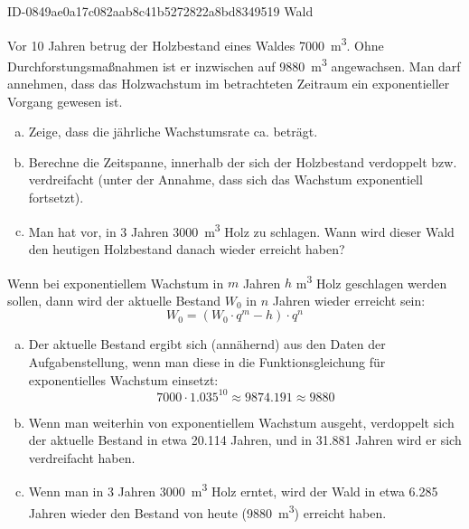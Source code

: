 \begin{exercise}
      {ID-0849ae0a17c082aab8c41b5272822a8bd8349519}
      {Wald}
  \ifproblem\problem\par
    Vor 10 Jahren betrug der Holzbestand eines Waldes \SI{7000}{\cubic\metre}.
    Ohne Durchforstungsmaßnahmen ist er inzwischen auf \SI{9880}{\cubic\metre}
    angewachsen. Man darf annehmen, dass das Holzwachstum im
    betrachteten Zeitraum ein exponentieller Vorgang gewesen ist.
    \begin{enumerate}[a)]
      \item Zeige, dass die jährliche Wachstumsrate ca.  beträgt.
      \item Berechne die Zeitspanne, innerhalb der sich der Holzbestand
            verdoppelt bzw. verdreifacht (unter der Annahme, dass sich
            das Wachstum exponentiell fortsetzt).
      \item Man hat vor, in 3 Jahren \SI{3000}{\cubic\metre} Holz zu schlagen.
            Wann wird dieser Wald den heutigen Holzbestand danach
            wieder erreicht haben?
    \end{enumerate}
  \fi
  \ifoutline\outline\par
    Wenn bei exponentiellem Wachstum in $m$ Jahren $h$
    \si{\cubic\metre} Holz geschlagen werden sollen, dann
    wird der aktuelle Bestand $W_{0}$ in $n$ Jahren wieder
    erreicht sein:
    \begin{equation*}
      W_{0}=\left(W_{0}\cdot q^{m}-h\right)\cdot q^{n}
    \end{equation*}
  \fi
  \ifoutcome\outcome\par
    \begin{enumerate}[a)]
      \item Der aktuelle Bestand ergibt sich (annähernd) aus
            den Daten der Aufgabenstellung, wenn man diese in
            die Funktionsgleichung für exponentielles Wachstum
            einsetzt:
            \begin{equation*}
              \num{7000}\cdot\num{1.035}^{10}\approx\num{9874.191}\approx\num{9880}
            \end{equation*}
      \item Wenn man weiterhin von exponentiellem Wachstum ausgeht,
            verdoppelt sich der aktuelle Bestand in etwa \num{20.114}
            Jahren, und in \num{31.881} Jahren wird er sich verdreifacht
            haben.
      \item Wenn man in 3 Jahren \SI{3000}{\cubic\metre} Holz erntet,
            wird der Wald in etwa \num{6.285} Jahren wieder den
            Bestand von heute (\SI{9880}{\cubic\metre}) erreicht haben.
    \end{enumerate}
  \fi
\end{exercise}
